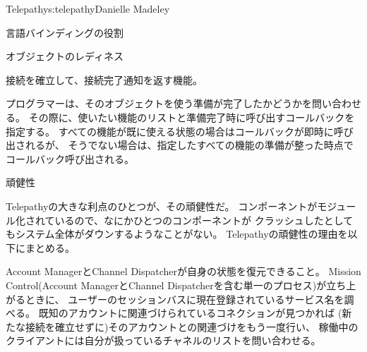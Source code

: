 \begin{aosachapter}{Telepathy}{s:telepathy}{Danielle Madeley}
\begin{aosasect1}{言語バインディングの役割}
\begin{aosasect2}{オブジェクトのレディネス}
\begin{aosaitemize}
  \item 接続を確立して、接続完了通知を返す機能。

\end{aosaitemize}

プログラマーは、そのオブジェクトを使う準備が完了したかどうかを問い合わせる。
その際に、使いたい機能のリストと準備完了時に呼び出すコールバックを指定する。
すべての機能が既に使える状態の場合はコールバックが即時に呼び出されるが、
そうでない場合は、指定したすべての機能の準備が整った時点でコールバック呼び出される。

\end{aosasect2}

\end{aosasect1}

\begin{aosasect1}{頑健性}

Telepathyの大きな利点のひとつが、その頑健性だ。
コンポーネントがモジュール化されているので、なにかひとつのコンポーネントが
クラッシュしたとしてもシステム全体がダウンするようなことがない。
Telepathyの頑健性の理由を以下にまとめる。

\begin{aosaitemize}

  \item Account ManagerとChannel Dispatcherが自身の状態を復元できること。
  Mission Control(Account ManagerとChannel Dispatcherを含む単一のプロセス)が立ち上がるときに、
  ユーザーのセッションバスに現在登録されているサービス名を調べる。
  既知のアカウントに関連づけられているコネクションが見つかれば
  (新たな接続を確立せずに)そのアカウントとの関連づけをもう一度行い、
  稼働中のクライアントには自分が扱っているチャネルのリストを問い合わせる。


\end{aosaitemize}
\end{aosasect1}
\end{aosachapter}
